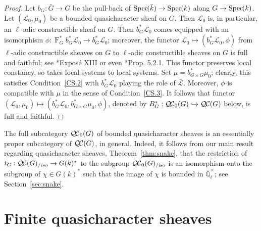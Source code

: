 \documentclass[11pt]{amsart}
\theoremstyle{plain}
\theoremstyle{definition}
\theoremstyle{remark}
\newcommand{\Spec}[1]{{\operatorname{Spec}\hskip-1pt( #1 )}}
\newcommand{\EE}{\mathbb{\bar Q}_\ell}
\newcommand{\bFq}{\bar{k}}
\newcommand{\Fq}{k}
\newcommand{\EEx}{\EE^\times}
\newcommand{\Frob}[1]{\operatorname{F}_{#1}}
\newcommand{\qcs}[1]{{\mathcal{#1}}}
\newcommand{\gqcs}[1]{{\mathcal{\bar #1}}}
\newcommand{\QC}{{\mathcal{Q\hskip-0.8pt C}}}
\newcommand{\QCb}{{\QC_0}}
\newcommand{\QCiso}[1]{\QC(#1)_{/\textit{iso}}}
\newcommand{\QCbiso}[1]{\QCb(#1)_{/\text{iso}}}
\newcommand{\trFrob}[1]{t_{#1}}
\begin{document}
\begin{proof}
 Let $b_G : {\bar G} \to G$ be the pull-back of $\Spec{\bFq} \to \Spec{\Fq}$ along $G\to \Spec{\Fq}$.
 Let $(\qcs{L}_0,\mu_0)$ be a bounded quasicharacter sheaf on $G$. 
 Then $\qcs{L}_0$ is, in particular, an $\ell$-adic constructible sheaf on $G$. 
 Then $b_G^* \qcs{L}_0$ comes equipped with an isomorphism 
 $\phi : \Frob{G}^* b_G^*\qcs{L}_0 \to b_G^* \qcs{L}_0$; 
 moreover, the functor $\qcs{L}_0 \mapsto (b_G^* \qcs{L}_0,\phi)$  
 from $\ell$-adic constructible sheaves on $G$ to $\ell$-adic constructible sheaves on $G$
 is full and faithful; see \cite{deligne-katz:SGA7.2}*{Expos\'e XIII} or even \cite{beilinson-bernstein-deligne:81a}*{Prop. 5.2.1}. 
 This functor preserves local constancy, so takes local systems to local systems. 
 Set $\mu = b_{G\times G}^*\mu_0$; clearly, this satisfies Condition~\ref{CS.2} 
 with $b_G^*\qcs{L}_0$ playing the role of $\gqcs{L}$.
 Moreover, $\phi$ is compatible with $\mu$ in the sense of Condition~\ref{CS.3}.
 It follows that functor $(\qcs{L}_0,\mu_0) \mapsto (b_G^*\qcs{L}_0,b_{G\times G}^* \mu_0, \phi)$,
 denoted by  $B_G^*: \QCb(G) \hookrightarrow \QC(G)$ below, is full and faithful.
\end{proof}

The full subcategory $\QCb(G)$ of bounded quasicharacter sheaves is an essentially
proper subcategory of $\QC(G)$, in general. Indeed, it follows from our main result
regarding quasicharacter sheaves, Theorem~\ref{thm:snake}, that the restriction of
$\trFrob{G} : \QCiso{G} \to G(\Fq)^*$ to the subgroup $\QCbiso{G}$ is an isomorphism
onto the subgroup of $\chi \in G(\Fq)^*$ such that the image of $\chi$ is bounded in $\EEx$;
see Section~\ref{sec:snake}.

\section{Finite quasicharacter sheaves}\label{sec:finite}

 
\end{document}
